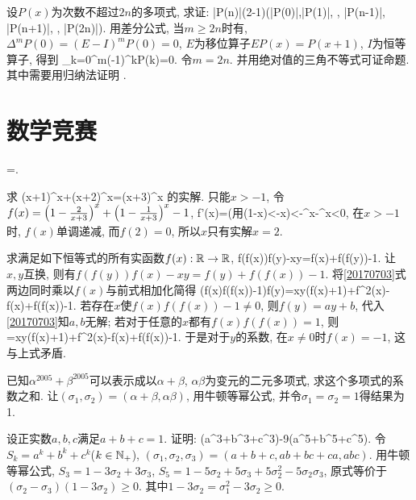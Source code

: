 设$P(x)$为次数不超过$2n$的多项式, 求证:
\bee
|P(n)|\le(2-1)\max(|P(0)|,|P(1)|, \cdots, |P(n-1)|, |P(n+1)|, \cdots, |P(2n)|).
\eee
\eq
\ba
用差分公式, 当$m\ge2n$时有, $\Delta^mP(0)=(E-I)^mP(0)=0$, $E$为移位算子$EP(x)=P(x+1)$, $I$为恒等算子, 得到
\bee
\sum_{k=0}^{m}(-1)^kP(k)=0.
\eee
令$m=2n$. 并用绝对值的三角不等式可证命题. 其中需要用归纳法证明
\bee
{}\ge{}.
\eee
\ea


\section{数学竞赛}
\bee
{}=.
\eee
\eq

\bq{}{}
求
\bee
(x+1)^x+(x+2)^x=(x+3)^x
\eee
的实解.
\eq
\ba
只能$x>-1$, 令$f(x)=\left(1-\frac2{x+3}\right)^x+\left(1-\frac1{x+3}\right)^x-1$,
\bee
f'(x)=\cdots(\textrm{用}\ln(1-x)<-x)<-^x-^x<0,
\eee
在$x>-1$时, $f(x)$单调递减, 而$f(2)=0$, 所以$x$只有实解$x=2$.
\ea

\bq{}{}
求满足如下恒等式的所有实函数$f(x):\mathbb{R}\to\mathbb{R}$,
\be\label{20170703}
f(f(x))f(y)-xy=f(x)+f(f(y))-1.
\ee
\eq
\ba
让$x,y$互换, 则有$f(f(y))f(x)-xy=f(y)+f(f(x))-1$. 将\ref{20170703}式两边同时乘以$f(x)$与前式相加化简得
\bee
(f(x)f(f(x))-1)f(y)=xy(f(x)+1)+f^2(x)-f(x)+f(f(x))-1.
\eee
若存在$x$使$f(x)f(f(x))-1\ne0$, 则$f(y)=ay+b$, 代入\ref{20170703}知$a,b$无解;
若对于任意的$x$都有$f(x)f(f(x))=1$, 则
=xy(f(x)+1)+f^2(x)-f(x)+f(f(x))-1.
\eee
于是对于$y$的系数, 在$x\ne0$时$f(x)=-1$, 这与上式矛盾.
\ea


已知$\alpha^{2005}+\beta^{2005}$可以表示成以$\alpha+\beta$, $\alpha\beta$为变元的二元多项式, 求这个多项式的系数之和.
\eq
\ba
让$(\sigma_1, \sigma_2)=(\alpha+\beta, \alpha\beta)$, 用牛顿等幂公式, 并令$\sigma_1=\sigma_2=1$得结果为1.
\ea

设正实数$a,b,c$满足$a+b+c=1$. 证明:
(a^3+b^3+c^3)-9(a^5+b^5+c^5).
\eee
\eq
\ba
令$S_k=a^k+b^k+c^k$($k\in\mathbb{N}_{+}$), $(\sigma_1,\sigma_2,\sigma_3)=(a+b+c,ab+bc+ca,abc)$. 用牛顿等幂公式,
$S_3=1-3\sigma_2+3\sigma_3$, $S_5=1-5\sigma_2+5\sigma_3+5\sigma_2^2-5\sigma_2\sigma_3$, 原式等价于
$(\sigma_2-\sigma_3)(1-3\sigma_2)\ge0$. 其中$1-3\sigma_2=\sigma_1^2-3\sigma_2\ge0$.
\ea

